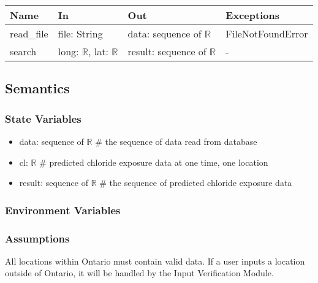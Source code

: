 \documentclass[12pt, titlepage]{article}
\begin{document}
\begin{center}
\begin{tabular}{p{2cm} p{4cm} p{4cm} p{4cm}}
\hline
\textbf{Name} & \textbf{In} & \textbf{Out} & \textbf{Exceptions} \\
\hline
read\_file & file: String & data: sequence of $\mathbb{R}$ & FileNotFoundError \\
search & long: $\mathbb{R}$, lat: $\mathbb{R}$  & result: sequence of  $\mathbb{R}$ & - \\
\hline
\end{tabular}
\end{center}

\subsection{Semantics}

\subsubsection{State Variables}
\begin{itemize}
\item data: sequence of $\mathbb{R}$ \# the sequence of data read from database
\item cl: $\mathbb{R}$ \# predicted chloride exposure data at one time, one location
\item result: sequence of $\mathbb{R}$ \# the sequence of predicted chloride exposure data

\end{itemize}

\subsubsection{Environment Variables}


\subsubsection{Assumptions}
All locations within Ontario must contain valid data. If a user inputs a location outside of Ontario, it will be handled by the Input Verification Module.
\end{document}
